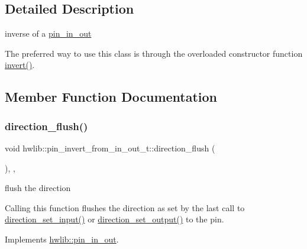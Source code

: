 \subsection{Detailed Description}
inverse of a \hyperlink{classhwlib_1_1pin__in__out}{pin\+\_\+in\+\_\+out}

The preferred way to use this class is through the overloaded constructor function \hyperlink{namespacehwlib_ab619d7f70bb62112b2a04192f5103a24}{invert()}. 

\subsection{Member Function Documentation}
\mbox{\label{classhwlib_1_1pin__invert__from__in__out__t_ac5480e6ca1a3e528e8f4e8ba3c946110}} 
\subsubsection{\texorpdfstring{direction\+\_\+flush()}{direction\_flush()}}
{\footnotesize\ttfamily void hwlib\+::pin\+\_\+invert\+\_\+from\+\_\+in\+\_\+out\+\_\+t\+::direction\+\_\+flush (\begin{DoxyParamCaption}{ }\end{DoxyParamCaption})\hspace{0.3cm}{\ttfamily [inline]}, {\ttfamily [override]}, {\ttfamily [virtual]}}

flush the direction

Calling this function flushes the direction as set by the last call to \hyperlink{classhwlib_1_1pin__invert__from__in__out__t_a2d332560ffbdac49b5807f43bb908b46}{direction\+\_\+set\+\_\+input()} or \hyperlink{classhwlib_1_1pin__invert__from__in__out__t_ae790759c546b1cd54c55b6aa3ec84600}{direction\+\_\+set\+\_\+output()} to the pin. 

Implements \hyperlink{classhwlib_1_1pin__in__out_a86ef2b296683d8c0133280075c82cb51}{hwlib\+::pin\+\_\+in\+\_\+out}.

\mbox{\label{classhwlib_1_1pin__invert__from__in__out__t_a2d332560ffbdac49b5807f43bb908b46}} 
